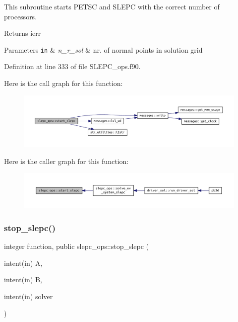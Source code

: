 This subroutine starts P\+E\+T\+SC and S\+L\+E\+PC with the correct number of processors. 

\begin{DoxyReturn}{Returns}
ierr
\end{DoxyReturn}

\begin{DoxyParams}[1]{Parameters}
\mbox{\tt in}  & {\em n\+\_\+r\+\_\+sol} & nr. of normal points in solution grid \\
\hline
\end{DoxyParams}


Definition at line 333 of file S\+L\+E\+P\+C\+\_\+ops.\+f90.

Here is the call graph for this function\+:\nopagebreak
\begin{figure}[H]
\begin{center}
\leavevmode
\includegraphics[width=350pt]{namespaceslepc__ops_a9cec5d9e8abc41d0d7ffb14352112040_cgraph}
\end{center}
\end{figure}
Here is the caller graph for this function\+:\nopagebreak
\begin{figure}[H]
\begin{center}
\leavevmode
\includegraphics[width=350pt]{namespaceslepc__ops_a9cec5d9e8abc41d0d7ffb14352112040_icgraph}
\end{center}
\end{figure}
\mbox{\label{namespaceslepc__ops_aeeac6908b3988f395314e7769829a058}} 
\subsubsection{\texorpdfstring{stop\+\_\+slepc()}{stop\_slepc()}}
{\footnotesize\ttfamily integer function, public slepc\+\_\+ops\+::stop\+\_\+slepc (\begin{DoxyParamCaption}\item[{intent(in)}]{A,  }\item[{intent(in)}]{B,  }\item[{intent(in)}]{solver }\end{DoxyParamCaption})}



